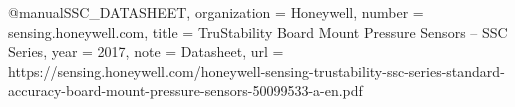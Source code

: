 

@manual{SSC_DATASHEET,
organization = {Honeywell},
number = {sensing.honeywell.com},
title = {{TruStability Board Mount Pressure Sensors -- SSC Series}},
year = {2017},
note = {Datasheet},
url = {https://sensing.honeywell.com/honeywell-sensing-trustability-ssc-series-standard-accuracy-board-mount-pressure-sensors-50099533-a-en.pdf}
}